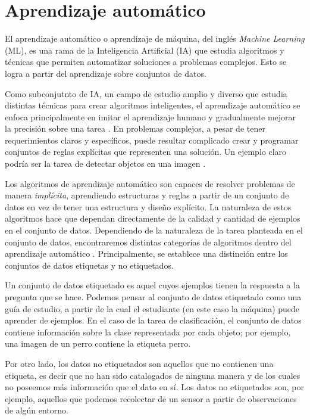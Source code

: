 \section{Aprendizaje automático}
\label{sec:ML}

El aprendizaje automático o aprendizaje de máquina, del inglés \textit{Machine Learning} (ML), es una rama de la Inteligencia Artificial (IA) que estudia algoritmos y técnicas que permiten automatizar soluciones a problemas complejos. Esto se logra a partir del aprendizaje sobre conjuntos de datos. 

Como subconjutnto de IA, un campo de estudio amplio y diverso que estudia distintas técnicas para crear algoritmos inteligentes, el aprendizaje automático se enfoca principalmente en imitar el aprendizaje humano y gradualmente mejorar la precisión sobre una tarea \cite{ibm_what_nodate}. En problemas complejos, a pesar de tener requerimientos claros y específicos, puede resultar complicado crear y programar conjuntos de reglas explícitas que representen una solución. Un ejemplo claro podría ser la tarea de detectar objetos en una imagen \cite{rebala_introduction_2019}.

Los algoritmos de aprendizaje automático son capaces de resolver problemas de manera {\it implícita}, aprendiendo estructuras y reglas a partir de un conjunto de datos en vez de tener una estructura y diseño explícito.  La naturaleza de estos algoritmos hace que dependan directamente de la calidad y cantidad de ejemplos en el conjunto de datos. Dependiendo de la naturaleza de la tarea planteada en el conjunto de datos, encontraremos distintas categorías de algoritmos dentro del aprendizaje automático \cite{rebala_introduction_2019}. Principalmente, se establece una distinción entre los conjuntos de datos etiquetas y no etiquetados.

Un conjunto de datos etiquetado es aquel cuyos ejemplos tienen la respuesta a la pregunta que se hace. Podemos pensar al conjunto de datos etiquetado como una guía de estudio, a partir de la cual el estudiante (en este caso la máquina) puede aprender de ejemplos. En el caso de la tarea de clasificación, el conjunto de datos contiene información sobre la clase representada por cada objeto; por ejemplo, una imagen de un perro contiene la etiqueta perro. 

Por otro lado, los datos no etiquetados son aquellos que no contienen una etiqueta, es decir que no han sido catalogados de ninguna manera y de los cuales no poseemos más información que el dato en sí. Los datos no etiquetados son, por ejemplo, aquellos que podemos recolectar de un sensor a partir de observaciones de algún entorno.

